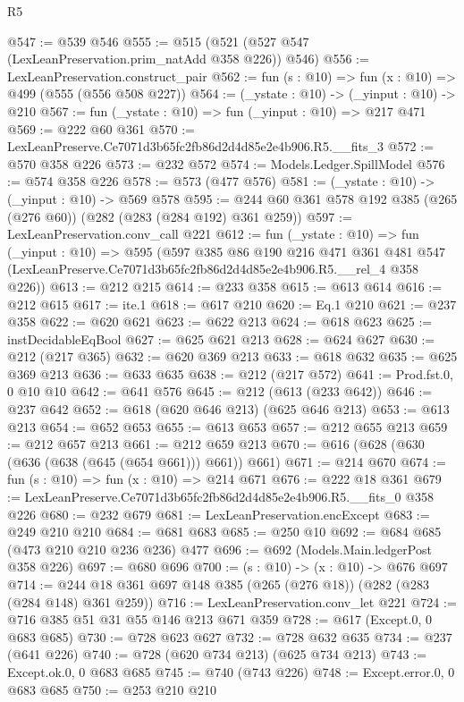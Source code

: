 \begin{lexlean}{R5}
\begin{coremodule}
@547 := @539 @546
@555 := @515 (@521 (@527 @547 (LexLeanPreservation.prim_natAdd @358 @226)) @546)
@556 := LexLeanPreservation.construct_pair
@562 := fun (s : @10) => fun (x : @10) => @499 (@555 (@556 @508 @227))
@564 := (_ystate : @10) -> (_yinput : @10) -> @210
@567 := fun (_ystate : @10) => fun (_yinput : @10) => @217 @471
@569 := @222 @60 @361
@570 := LexLeanPreserve.Ce7071d3b65fc2fb86d2d4d85e2e4b906.R5.__fits_3
@572 := @570 @358 @226
@573 := @232 @572
@574 := Models.Ledger.SpillModel
@576 := @574 @358 @226
@578 := @573 (@477 @576)
@581 := (_ystate : @10) -> (_yinput : @10) -> @569 @578
@595 := @244 @60 @361 @578 @192 @385 (@265 (@276 @60)) (@282 (@283 (@284 @192) @361 @259))
@597 := LexLeanPreservation.conv_call @221
@612 := fun (_ystate : @10) =>
  fun (_yinput : @10) =>
  @595
    (@597
      @385
      @86
      @190
      @216
      @471
      @361
      @481
      @547
      (LexLeanPreserve.Ce7071d3b65fc2fb86d2d4d85e2e4b906.R5.__rel_4 @358 @226))
@613 := @212 @215
@614 := @233 @358
@615 := @613 @614
@616 := @212 @615
@617 := ite.{1}
@618 := @617 @210
@620 := Eq.{1} @210
@621 := @237 @358
@622 := @620 @621
@623 := @622 @213
@624 := @618 @623
@625 := instDecidableEqBool
@627 := @625 @621 @213
@628 := @624 @627
@630 := @212 (@217 @365)
@632 := @620 @369 @213
@633 := @618 @632
@635 := @625 @369 @213
@636 := @633 @635
@638 := @212 (@217 @572)
@641 := Prod.fst.{0, 0} @10 @10
@642 := @641 @576
@645 := @212 (@613 (@233 @642))
@646 := @237 @642
@652 := @618 (@620 @646 @213) (@625 @646 @213)
@653 := @613 @213
@654 := @652 @653
@655 := @613 @653
@657 := @212 @655 @213
@659 := @212 @657 @213
@661 := @212 @659 @213
@670 := @616 (@628 (@630 (@636 (@638 (@645 (@654 @661))) @661)) @661)
@671 := @214 @670
@674 := fun (s : @10) => fun (x : @10) => @214 @671
@676 := @222 @18 @361
@679 := LexLeanPreserve.Ce7071d3b65fc2fb86d2d4d85e2e4b906.R5.__fits_0 @358 @226
@680 := @232 @679
@681 := LexLeanPreservation.encExcept
@683 := @249 @210 @210
@684 := @681 @683
@685 := @250 @10
@692 := @684 @685 (@473 @210 @210 @236 @236) @477
@696 := @692 (Models.Main.ledgerPost @358 @226)
@697 := @680 @696
@700 := (s : @10) -> (x : @10) -> @676 @697
@714 := @244 @18 @361 @697 @148 @385 (@265 (@276 @18)) (@282 (@283 (@284 @148) @361 @259))
@716 := LexLeanPreservation.conv_let @221
@724 := @716 @385 @51 @31 @55 @146 @213 @671 @359
@728 := @617 (Except.{0, 0} @683 @685)
@730 := @728 @623 @627
@732 := @728 @632 @635
@734 := @237 (@641 @226)
@740 := @728 (@620 @734 @213) (@625 @734 @213)
@743 := Except.ok.{0, 0} @683 @685
@745 := @740 (@743 @226)
@748 := Except.error.{0, 0} @683 @685
@750 := @253 @210 @210

\end{coremodule}
\end{lexlean}
